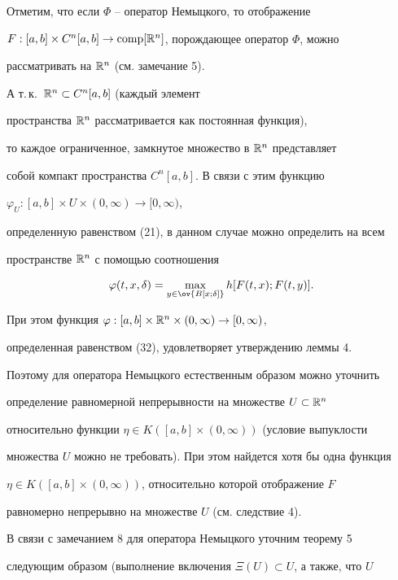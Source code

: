 \begin{note} Отметим, что если $\Phi$ -- оператор Немыцкого, то отображение


$F:[a,b]\times C^n[a,b]\to\operatorname{comp}[\Bbb R^n]$, порождающее оператор $\Phi$, можно


рассматривать на $\Bbb R^n$ (см. замечание 5).


А т.\,к.~$\Bbb R^n\subset C^n[a,b]$ (каждый элемент


пространства $\Bbb R^n$ рассматривается как постоянная функция),


то каждое ограниченное, замкнутое множество в $\Bbb R^n$ представляет


собой компакт пространства $C^n[a,b]$. В связи с этим функцию


$\varphi_U:[a,b]\times U\times(0,\infty)\to[0,\infty)$,


определенную равенством (21), в данном случае можно определить на всем


пространстве $\Bbb R^n$ с помощью соотношения


\begin{equation}


\varphi(t,x,\delta)=\max_{y\in \ov{B[x;\delta]}}h[F(t,x);F(t,y)].


\end{equation}


При этом функция $\varphi:[a,b]\times\Bbb R^n\times(0,\infty)\to[0,\infty)$,


определенная равенством (32), удовлетворяет утверждению леммы 4.


Поэтому для оператора Немыцкого естественным образом можно уточнить


определение равномерной непрерывности на множестве $U\subset\Bbb R^n$


относительно функции $\eta\in K([a,b]\times(0,\infty))$ (условие выпуклости


множества $U$ можно не требовать). При этом найдется хотя бы одна функция


$\eta\in K([a,b]\times(0,\infty))$, относительно которой отображение $F$


равномерно непрерывно на множестве $U$ (см. следствие 4).


\end{note}





В связи с замечанием 8 для оператора Немыцкого уточним теорему 5


следующим образом (выполнение включения $\Xi(U)\subset U$, а также, что $U$


